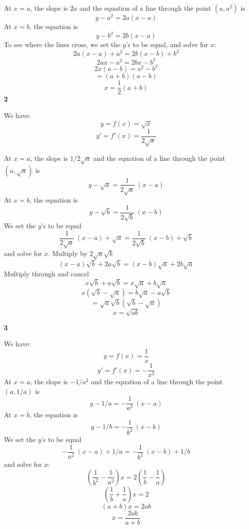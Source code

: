 \documentclass[11pt, oneside]{article}
\begin{document}
At $x = a$, the slope is $2a$ and the equation of a line through the point $(a, a^2)$ is
\[ y - a^2 = 2a(x - a) \]
At $x = b$, the equation is
\[ y - b^2 = 2b(x - a) \]
To see where the lines cross, we set the $y$'s to be equal, and solve for $x$:
\[ 2a(x - a) + a^2 = 2b(x - b) + b^2 \]
\[ 2ax - a^2 = 2bx - b^2 \]
\[ 2x(a - b) = a^2 - b^2 \]
\[ = (a + b)(a - b) \]
\[ x = \frac{1}{2} (a + b) \]
\textbf{2}

We have:
\[ y = f(x) = \sqrt{x} \]
\[ y' = f'(x) = \frac{1}{2 \sqrt{x}} \]

At $x = a$, the slope is $1/2 \sqrt{a}$ and the equation of a line through the point $(a, \sqrt{a})$ is
\[ y - \sqrt{a} = \frac{1}{2 \sqrt{a}} \ (x - a) \]
At $x = b$, the equation is
\[ y - \sqrt{b} = \frac{1}{2 \sqrt{b}} \ (x - b) \]
We set the $y$'s to be equal
\[ \frac{1}{2 \sqrt{a}} \ (x - a) + \sqrt{a} =  \frac{1}{2 \sqrt{b}} \ (x - b) + \sqrt{b} \]
and solve for $x$.  Multiply by $2 \sqrt{a}\sqrt{b}$
\[ (x - a)\sqrt{b} + 2a \sqrt{b} = (x - b) \sqrt{a} + 2 b \sqrt{a} \]
Multiply through and cancel
\[ x \sqrt{b} + a \sqrt{b} = x \sqrt{a} + b \sqrt{a} \]
\[ x(\sqrt{b} - \sqrt{a}) = b \sqrt{a} - a \sqrt{b} \]
\[ = \sqrt{a}\sqrt{b} (\sqrt{b} - \sqrt{a}) \]
\[ x = \sqrt{ab}\]

\textbf{3}

We have:
\[ y = f(x) = \frac{1}{x} \]
\[ y' = f'(x) = - \frac{1}{x^2} \]
At $x = a$, the slope is $-1/a^2$ and the equation of a line through the point $(a, 1/a)$ is
\[ y - 1/a = -\frac{1}{a^2} \ (x - a) \]
At $x = b$, the equation is
\[ y - 1/b = -\frac{1}{b^2} \ (x - b) \]
We set the $y$'s to be equal
\[  -\frac{1}{a^2} \ (x - a) + 1/a =  -\frac{1}{b^2} \ (x - b) + 1/b \]
and solve for $x$:
\[ (\frac{1}{b^2} - \frac{1}{a^2}) x = 2 ( \frac{1}{b} - \frac{1}{a} ) \]
\[ ( \frac{1}{b} + \frac{1}{a} ) x = 2 \]
\[ (a + b) x = 2ab \]
\[ x = \frac{2ab}{a + b} \]
\end{document}
